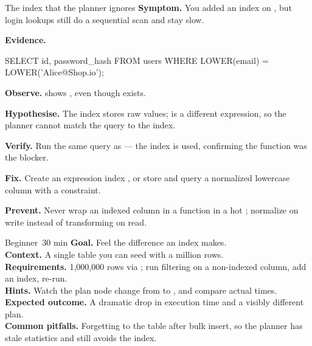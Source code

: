 \begin{debuglab}{The index that the planner ignores}
\textbf{Symptom.} You added an index on , but login lookups still do a sequential scan and stay slow.

\smallskip\textbf{Evidence.}
\begin{sqlbox}
SELECT id, password_hash FROM users
WHERE LOWER(email) = LOWER('Alice@Shop.io');
\end{sqlbox}

\begin{tickcheck}
  \item \textbf{Observe.}  shows , even though  exists.
  \item \textbf{Hypothesise.} The index stores raw  values;  is a different expression, so the planner cannot match the query to the index.
  \item \textbf{Verify.} Run the same query as  --- the index is used, confirming the function was the blocker.
  \item \textbf{Fix.} Create an expression index , or store and query a normalized lowercase  column with a  constraint.
  \item \textbf{Prevent.} Never wrap an indexed column in a function in a hot ; normalize on write instead of transforming on read.
\end{tickcheck}
\end{debuglab}


\begin{minilab}{Beginner}{~30 min}
\textbf{Goal.} Feel the difference an index makes.\\
\textbf{Context.} A single table you can seed with a million rows.\\
\textbf{Requirements.}  1{,}000{,}000 rows via ; run  filtering on a non-indexed column, add an index, re-run.\\
\textbf{Hints.} Watch the plan node change from  to , and compare actual times.\\
\textbf{Expected outcome.} A dramatic drop in execution time and a visibly different plan.\\
\textbf{Common pitfalls.} Forgetting to  the table after bulk insert, so the planner has stale statistics and still avoids the index.
\end{minilab}


